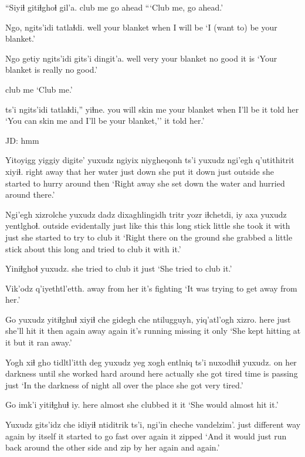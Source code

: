 \documentclass[12pt]{article}
\begin{document}
\gll ``{Siyiɬ gitiɬghoɬ} gil'a.
{club me} {go ahead}
\glt ```Club me, go ahead.'
\glend

\gll Ngo, ngits'idi tatlaɬdi.
well {your blanket} {when I will be}
\glt `I (want to) be your blanket.'
\glend

\gll Ngo getiy ngits'idi gits'i dingit'a.
well very {your blanket} {no good} {it is}
\glt `Your blanket is really no good.'
\glend

{{club me}}
\glt `Club me.'
\glend

 ts'i ngits'idi tatlaɬdi,'' yiɬne.
{you will skin me} {} {your blanket} {when I'll be} {it told her}
\glt `You can skin me and I'll be your blanket,'' it told her.' 
\glend

JD:  hmm

\gll Yitoyigg yiggiy digite' yuxudz ngiyix niygheqonh ts'i yuxudz ngi'egh q'utithitrit xiyiɬ.
{right away} that {her water} just down {she put it down} {} just outside {she started to hurry around} then
\glt `Right away she set down the water and hurried around there.'
\glend

\gll Ngi'egh xizrolche yuxudz dadz dixaghlingidh tritr yozr iɬchetdi, iy axa yuxudz yentlghoɬ.
outside evidentally just {like this} {this long} stick little {she took} it with just {she started to try to club it}	
\glt `Right there on the ground she grabbed a little stick about this long and tried to club it with it.' 
\glend

\gll Yiniɬghoɬ yuxudz. 
{she tried to club it} just
\glt `She tried to club it.'
\glend

\gll Vik'odz q'iyethtl'etth.
{away from her} {it's fighting}
\glt `It was trying to get away from her.'
\glend

\gll Go yuxudz yitiɬghuɬ xiyiɬ che gidegh che ntilugguyh, yiq'atl'ogh xizro.
here just {she'll hit it} then again away again {it's running} {missing it} only
\glt `She kept hitting at it but it ran away.'
\glend

\gll Yogh xiɬ gho tidltl'itth deg {yuxudz yeg} {xogh entlniq} ts'i nuxodhiɬ yuxudz.
{on her} darkness until {she worked hard} {around here} actually {she got tired} {} {time is passing} just
\glt `In the darkness of night all over the place she got very tired.'
\glend

\gll Go imk'i yitiɬghuɬ iy.
here almost {she clubbed it} it
\glt `She would almost hit it.'
\glend

\gll Yuxudz gits'idz che idiyiɬ ntiditrik ts'i, ngi'in cheche vandelzim'. 
just {different way} again {by itself} {it started to go fast} {} over again {it zipped}
\glt `And it would just run back around the other side and zip by her again and again.'
\glend
\end{document}
